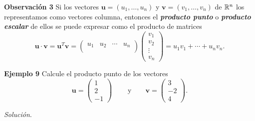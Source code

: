 {\nologo
\begin{frame}%

\begin{alertblock}{\textbf{Observación 3}}\justifying
	Si los vectores $\mathbf{u}=(u_1,\hdots,u_n) $ y $\mathbf{v}=(v_1,\hdots,v_n)$ de $\mathbb{R}^n$ 
	los representamos como vectores columna, entonces el \textbf{\textit{producto punto}} o \textbf{\textit{producto escalar}} de ellos
	se puede expresar como el producto de matrices
	\[
	\mathbf{u}\cdot \mathbf{v} =
	\mathbf{u}^T \mathbf{v} =
	\left(
	\begin{array}{cccc}
	u_1 & u_2 & \cdots & u_n \\
	\end{array}
	\right) 
	\left(
	\begin{array}{c}
	v_1\\
	v_2\\
	\vdots \\[1mm]
	v_n
	\end{array}
	\right)
	= u_1 v_1 +  \cdots + u_nv_n. 
	\]
\end{alertblock}

\begin{ej}{\textbf{Ejemplo 9}}
	Calcule el producto punto de los vectores
	\[
	\mathbf{u} =
	\left(
	\begin{array}{r}
	1\\
	2\\
	-1
	\end{array}
	\right)\ 
	\qquad \text{y} \qquad 
	\mathbf{v} =
	\left(
	\begin{array}{r}
	3\\
	-2\\
	4
	\end{array}
	\right). 
	\]	
\end{ej}
\textit{Solución}.

\end{frame}
}


\subsection{}

